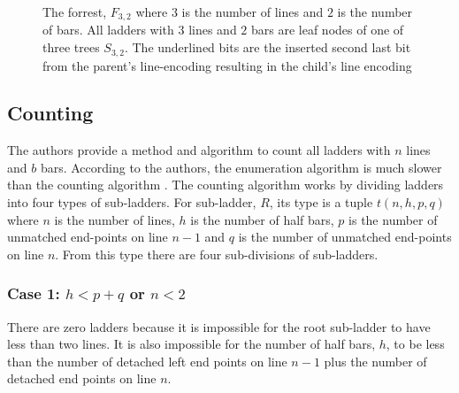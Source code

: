 \begin{figure}[!htp]
\begin{flushleft}
\begin{minipage}{0.8\textwidth}
        \end{minipage}
    \end{flushleft}
    \caption{The forrest, $F_{3,2}$ where $3$ is the number of lines and $2$ is the number of bars. All ladders with $3$ lines and $2$ bars are leaf nodes of one of three trees $S_{3,2}$.
    The underlined bits are the inserted second last bit from the parent's line-encoding resulting in the child's line encoding}
\end{figure}


\subsection{Counting}
The authors provide a method and algorithm to count all ladders 
with $n$ lines and $b$ bars. According to the authors, the enumeration algorithm is 
much slower than the counting algorithm \cite{A6}. The counting algorithm 
works by dividing ladders into four types of sub-ladders.
For sub-ladder, $R$, its type is a tuple $t(n,h,p,q)$ where 
$n$ is the number of lines, $h$ is the number of half bars, 
$p$ is the number of unmatched end-points on line $n-1$ and 
$q$ is the number of unmatched end-points on line $n$. From this 
type there are four sub-divisions of sub-ladders.
\subsubsection{Case 1: $h < p+q$ or $n<2$}
There are zero ladders because it is impossible for the 
root sub-ladder to have less than two lines. It is also 
impossible for the number of half bars, $h$, to 
be less than the number of detached left end points 
on line $n-1$ plus the number of detached end points on 
line $n$.

